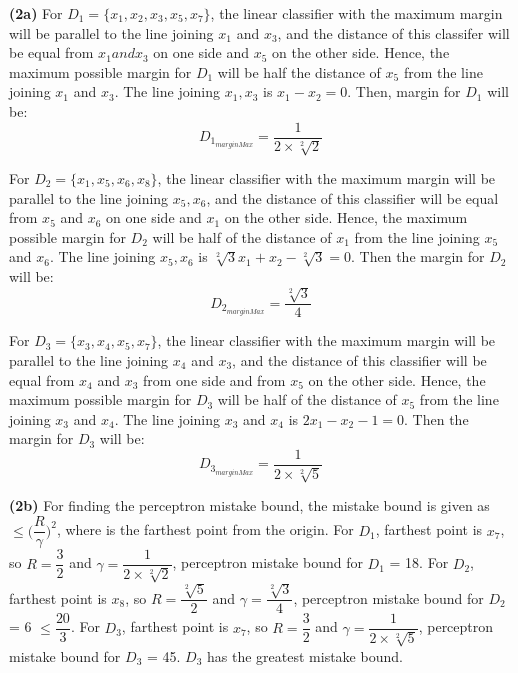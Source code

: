 \documentclass{article}
\renewcommand\part[1]{\vspace{.10in}\textbf{(#1)}}
\begin{document}
  \part{2a} For $D_1 = \{x_1, x_2, x_3, x_5, x_7\}$, the linear classifier with the maximum margin will be parallel to the line joining $x_1$ and $x_3$, and the distance of this classifer will be equal from $x_1 and x_3$ on one side and $x_5$ on the other side.  Hence, the maximum possible margin for $D_1$ will be half the distance of $x_5$ from the line joining $x_1$ and $x_3$. The line joining $x_1,x_3$ is $x_1 - x_2 = 0$. Then, margin for $D_1$ will be: \newline
  \[D_{1_{marginMax}} = \dfrac{1}{2 \times \sqrt[2]{2}}\]
 
    For $D_2 = \{ x_1, x_5, x_6, x_8\}$, the linear classifier with the maximum margin will be parallel to the line joining $x_5, x_6$, and the distance of this classifier will be equal from $x_5$ and $x_6$ on one side and $x_1$ on the other side. Hence, the maximum possible margin for $D_2$ will be half of the distance of $x_1$ from the line joining $x_5$ and $x_6$. The line joining $x_5, x_6$ is $\sqrt[2]{3}x_1 + x_2 - \sqrt[2]{3} = 0$. Then the margin for $D_2$ will be: \newline
    \[D_{2_{marginMax}} = \dfrac{\sqrt[2]{3}}{4} \]

    For $D_3 = \{ x_3, x_4, x_5, x_7 \}$, the linear classifier with the maximum margin will be parallel to the line joining $x_4$ and $x_3$, and the distance of this classifier will be equal from $x_4$ and $x_3$ from one side and from $x_5$ on the other side. Hence, the maximum possible margin for $D_3$ will be half of the distance of $x_5$ from the line joining $x_3$ and $x_4$. The line joining $x_3$ and $x_4$ is $2x_1 - x_2 - 1 = 0$. Then the margin for $D_3$ will be: \newline
    \[ D_{3_{marginMax}} = \dfrac{1}{2\times \sqrt[2]{5}}\]

    \part{2b}
    For finding the perceptron mistake bound, the mistake bound is given as $\leq \bigg ( \dfrac{R}{\gamma} \bigg )^2$, where is the farthest point from the origin. \newline
    For $D_1$, farthest point is $x_7$, so $R=\dfrac{3}{2}$ and $\gamma = \dfrac{1}{2 \times \sqrt[2]{2}}$, perceptron mistake bound for $D_1$ = 18. \newline
    For $D_2$, farthest point is $x_8$, so $R=\dfrac{\sqrt[2]{5}}{2}$ and $\gamma=\dfrac{\sqrt[2]{3}}{4}$, perceptron mistake bound for $D_2$ = 6 $\leq \dfrac{20}{3}$. \newline
    For $D_3$, farthest point is $x_7$, so $R=\dfrac{3}{2}$ and $\gamma = \dfrac{1}{2\times \sqrt[2]{5}}$, perceptron mistake bound for $D_3$ = 45. \newline
    $D_3$ has the greatest mistake bound. \newline
\end{document}
